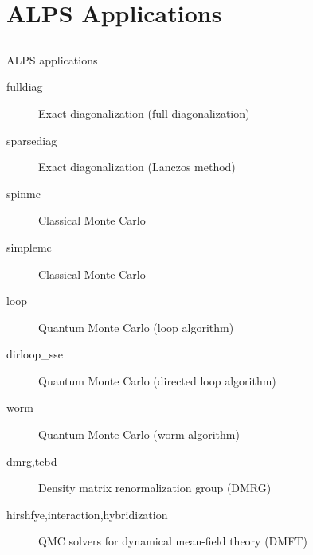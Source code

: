 \section{ALPS Applications}
\subsection*{\redb\whiteb\greenb}

\begin{frame}[t,fragile]{ALPS applications}
  \begin{description}
  \item[fulldiag] Exact diagonalization (full diagonalization)
  \item[sparsediag] Exact diagonalization (Lanczos method)
  \item[spinmc] Classical Monte Carlo
  \item[simplemc] Classical Monte Carlo
  \item[loop] Quantum Monte Carlo (loop algorithm)
  \item[dirloop\_sse] Quantum Monte Carlo (directed loop algorithm)
  \item[worm] Quantum Monte Carlo (worm algorithm)
  \item[dmrg,tebd] Density matrix renormalization group (DMRG)
  \item[hirshfye,interaction,hybridization] QMC solvers for dynamical mean-field theory (DMFT)
  \end{description}
\end{frame}

